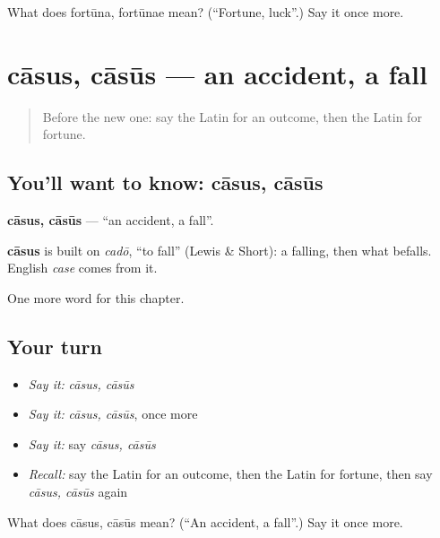 \begin{tcolorbox}[breakable,colback=teal!4,colframe=teal!35!black,title={Before you move on}]
What does fortūna, fortūnae mean? (\textquotedblleft{}Fortune, luck\textquotedblright{}.) Say it once more.
\end{tcolorbox}
\section[cāsus, cāsūs]{cāsus, cāsūs — an accident, a fall}

\label{lesson:LA-C221-casus}



\begin{quote}
Before the new one: say the Latin for an outcome, then the Latin for fortune.
\end{quote}

\subsection*{You'll want to know: cāsus, cāsūs}
\textbf{cāsus, cāsūs} — \textquotedblleft{}an accident, a fall\textquotedblright{}.

\begin{cousinweb}
\textbf{cāsus} is built on \emph{cadō}, \textquotedblleft{}to fall\textquotedblright{} (Lewis \& Short): a falling, then what befalls. English \emph{case} comes from it.
\end{cousinweb}

\begin{grammarlens}[title={What you've built}]
One more word for this chapter.
\end{grammarlens}

\subsection*{Your turn}
\begin{itemize}
\raggedright
  \item \emph{Say it:} \emph{cāsus, cāsūs}
  \item \emph{Say it:} \emph{cāsus, cāsūs}, once more
  \item \emph{Say it:} say \emph{cāsus, cāsūs}
  \item \emph{Recall:} say the Latin for an outcome, then the Latin for fortune, then say \emph{cāsus, cāsūs} again
\end{itemize}

\begin{tcolorbox}[breakable,colback=teal!4,colframe=teal!35!black,title={Before you move on}]
What does cāsus, cāsūs mean? (\textquotedblleft{}An accident, a fall\textquotedblright{}.) Say it once more.
\end{tcolorbox}
